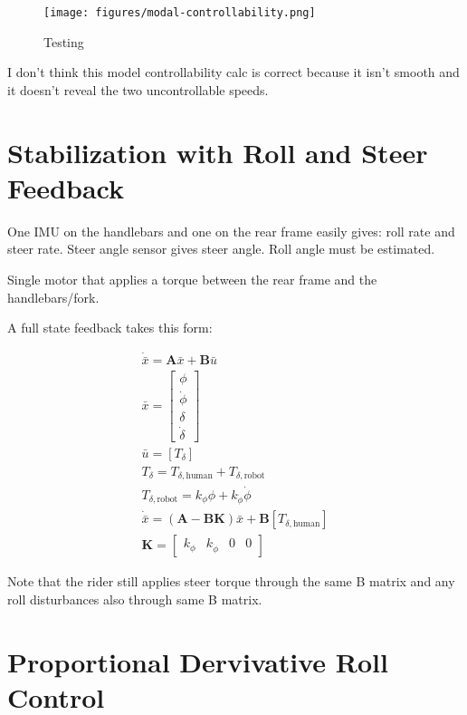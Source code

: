 \documentclass[12pt]{article}
\begin{document}
\begin{figure}
  \centering
  \texttt{[image: figures/modal-controllability.png]}
  \caption{Testing}
  \label{fig:modal-controllability}
\end{figure}

I don't think this model controllability calc is correct because it isn't
smooth and it doesn't reveal the two uncontrollable speeds.

\section{Stabilization with Roll and Steer Feedback}

One IMU on the handlebars and one on the rear frame easily gives: roll rate and
steer rate. Steer angle sensor gives steer angle. Roll angle must be estimated.

Single motor that applies a torque between the rear frame and the
handlebars/fork.

A full state feedback takes this form:

\begin{align}
  \dot{\bar{x}} = \mathbf{A} \bar{x} + \mathbf{B} \bar{u} \\
  \bar{x} = \begin{bmatrix} \phi \\ \dot{\phi} \\ \delta \\ \dot{\delta} \end{bmatrix} \\
  \bar{u} = \left[ T_\delta \right] \\
  T_\delta = T_{\delta,\textrm{human}} + T_{\delta,\textrm{robot}} \\
  T_{\delta,\textrm{robot}} = k_\phi \phi + k_{\dot{\phi}} \dot{\phi} \\
  \dot{\bar{x}} = \left( \mathbf{A} - \mathbf{B} \mathbf{K} \right) \bar{x} + \mathbf{B} \left[ T_{\delta,\textrm{human}} \right] \\
  \mathbf{K} = \begin{bmatrix} k_\phi & k_{\dot{\phi}} & 0 & 0 \end{bmatrix}
\end{align}

Note that the rider still applies steer torque through the same B matrix and
any roll disturbances also through same B matrix.

\section{Proportional Dervivative Roll Control}
\end{document}
